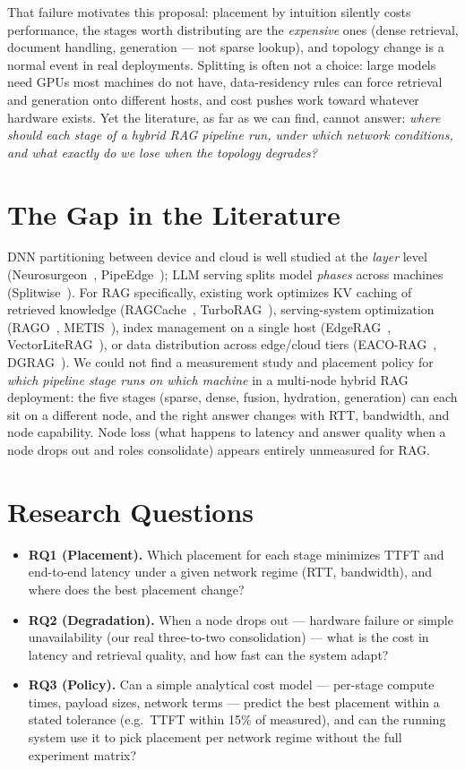 \documentclass[10pt]{article}
\begin{document}
That failure motivates this proposal: placement by intuition silently costs performance, the
stages worth distributing are the \emph{expensive} ones (dense retrieval, document handling,
generation --- not sparse lookup), and topology change is a normal event in real deployments.
Splitting is often not a choice: large models need GPUs most machines do not have, data-residency
rules can force retrieval and generation onto different hosts, and cost pushes work toward
whatever hardware exists. Yet the literature, as far as we can find, cannot
answer: \emph{where should each stage of a hybrid RAG pipeline run, under which network
conditions, and what exactly do we lose when the topology degrades?}

\section{The Gap in the Literature}
DNN partitioning between device and cloud is well studied at the \emph{layer} level
(Neurosurgeon~\cite{neurosurgeon}, PipeEdge~\cite{pipeedge}); LLM serving splits model \emph{phases}
across machines (Splitwise~\cite{splitwise}). For RAG specifically, existing work optimizes KV
caching of retrieved knowledge (RAGCache~\cite{ragcache}, TurboRAG~\cite{turborag}),
serving-system optimization (RAGO~\cite{rago}, METIS~\cite{metis}), index management on a single
host (EdgeRAG~\cite{edgerag}, VectorLiteRAG~\cite{vectorliterag}), or data distribution
across edge/cloud tiers (EACO-RAG~\cite{eacorag}, DGRAG~\cite{dgrag}). We could not find a
measurement study and placement policy for \emph{which pipeline stage runs on which machine} in a
multi-node hybrid RAG deployment: the five stages (sparse, dense, fusion, hydration, generation)
can each sit on a different node, and the right answer changes with RTT, bandwidth, and node
capability. Node loss (what happens to latency and answer quality when a node drops out and roles
consolidate) appears entirely unmeasured for RAG.

\section{Research Questions}
\begin{itemize}
  \item \textbf{RQ1 (Placement).} Which placement for each stage minimizes TTFT and end-to-end
  latency under a given network regime (RTT, bandwidth), and where does the best placement
  change?
  \item \textbf{RQ2 (Degradation).} When a node drops out --- hardware failure or simple
  unavailability (our real three-to-two consolidation) --- what is the cost in latency and
  retrieval quality, and how fast can the system adapt?
  \item \textbf{RQ3 (Policy).} Can a simple analytical cost model --- per-stage compute times,
  payload sizes, network terms --- predict the best placement within a stated tolerance (e.g.\
  TTFT within 15\% of measured), and can the running system use it to pick placement per network
  regime without the full experiment matrix?
\end{itemize}
\end{document}
